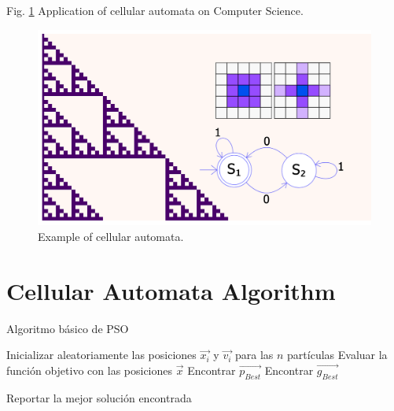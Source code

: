 \documentclass[9pt,a4paper,twoside]{tau-class/tau}
\begin{document}
        Fig. \ref{fig:figure} Application of cellular automata on Computer Science.
	\begin{figure}[H]
		\centering
		\includegraphics[width=0.75\columnwidth]{figures/theoryOfComputation.png}
		\caption{Example of cellular automata.}
		\label{fig:figure}
	\end{figure}
    \newpage

\section{Cellular Automata Algorithm}

    \begin{algorithm}
        \caption{Algoritmo básico de PSO}
        
        Inicializar aleatoriamente las posiciones $\vec{x_i}$ y $\vec{v_i}$ para las $n$ partículas\;
        Evaluar la función objetivo con las posiciones $\vec{x}$\;
        Encontrar $\vec{p_{Best}}$\;
        Encontrar $\vec{g_{Best}}$\;
        
        
        Reportar la mejor solución encontrada\;
        
        \end{algorithm}
\end{document}
